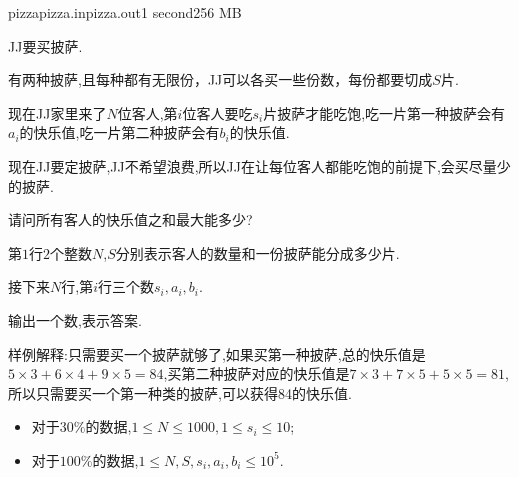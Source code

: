 \documentclass[11pt,a4paper,oneside]{article}
\begin{document}
\begin{problem}{pizza}{pizza.in}{pizza.out}{1 second}{256 MB}
    
    JJ要买披萨.
    
    有两种披萨,且每种都有无限份，JJ可以各买一些份数，每份都要切成$S$片.
    
    现在JJ家里来了$N$位客人,第$i$位客人要吃$s_i$片披萨才能吃饱,吃一片第一种披萨会有$a_i$的快乐值,吃一片第二种披萨会有$b_i$的快乐值.
    
    现在JJ要定披萨,JJ不希望浪费,所以JJ在让每位客人都能吃饱的前提下,会买尽量少的披萨.
    
    请问所有客人的快乐值之和最大能多少?

    \InputFile

    第$1$行$2$个整数$N$,$S$分别表示客人的数量和一份披萨能分成多少片.
    
    接下来$N$行,第$i$行三个数$s_i, a_i, b_i$.

    \OutputFile

	输出一个数,表示答案.

    \Example

    \begin{example}
    \end{example}

	样例解释:只需要买一个披萨就够了,如果买第一种披萨,总的快乐值是$5 \times 3 + 6 \times 4 + 9 \times 5 = 84$,买第二种披萨对应的快乐值是$7 \times  3 + 7 \times 5 + 5 \times 5 = 81$,所以只需要买一个第一种类的披萨,可以获得84的快乐值.
	
	\begin{example}
	\end{example}

    \Note
    
    \begin{itemize}
    	\item 对于$30\%$的数据,$1 \leq N \leq 1000, 1 \leq s_i \leq 10$;
        \item 对于$100\%$的数据,$1 \leq N, S, s_i, a_i, b_i \leq 10^5$.
    \end{itemize}

\end{problem}
\end{document}

